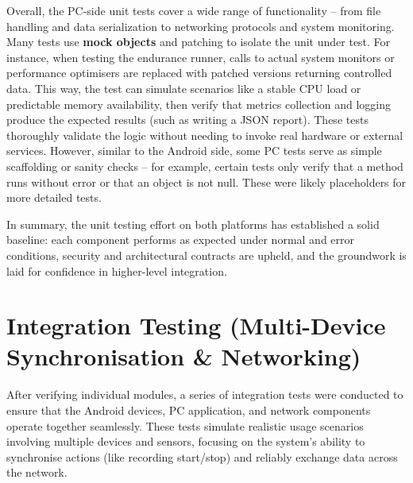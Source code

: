 Overall, the PC-side unit tests cover a wide range of functionality -- from file handling and data serialization to networking protocols and system monitoring. Many tests use \textbf{mock objects} and patching to isolate the unit under test. For instance, when testing the endurance runner, calls to actual system monitors or performance optimisers are replaced with patched versions returning controlled data. This way, the test can simulate scenarios like a stable CPU load or predictable memory availability, then verify that metrics collection and logging produce the expected results (such as writing a JSON report). These tests thoroughly validate the logic without needing to invoke real hardware or external services. However, similar to the Android side, some PC tests serve as simple scaffolding or sanity checks -- for example, certain tests only verify that a method runs without error or that an object is not null. These were likely placeholders for more detailed tests.

In summary, the unit testing effort on both platforms has established a solid baseline: each component performs as expected under normal and error conditions, security and architectural contracts are upheld, and the groundwork is laid for confidence in higher-level integration.


\section{Integration Testing (Multi-Device Synchronisation \& Networking)}
After verifying individual modules, a series of integration tests were conducted to ensure that the Android devices, PC application, and network components operate together seamlessly. These tests simulate realistic usage scenarios involving multiple devices and sensors, focusing on the system's ability to synchronise actions (like recording start/stop) and reliably exchange data across the network.


